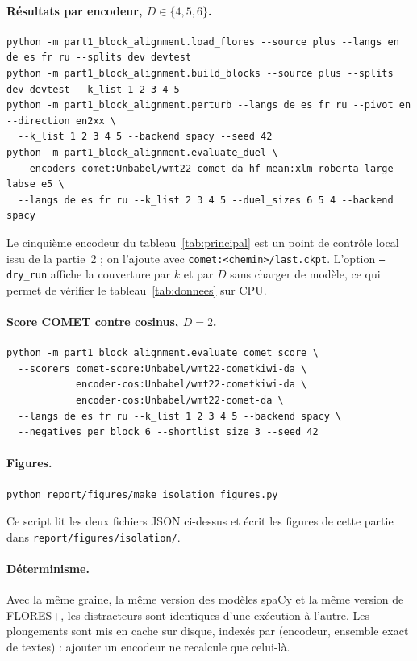 \documentclass[11pt]{article}
\newcommand{\code}[1]{\texttt{\small #1}}
\begin{document}
\paragraph{Résultats par encodeur, $D \in \{4,5,6\}$.}
\begin{verbatim}
python -m part1_block_alignment.load_flores --source plus --langs en de es fr ru --splits dev devtest
python -m part1_block_alignment.build_blocks --source plus --splits dev devtest --k_list 1 2 3 4 5
python -m part1_block_alignment.perturb --langs de es fr ru --pivot en --direction en2xx \
  --k_list 1 2 3 4 5 --backend spacy --seed 42
python -m part1_block_alignment.evaluate_duel \
  --encoders comet:Unbabel/wmt22-comet-da hf-mean:xlm-roberta-large labse e5 \
  --langs de es fr ru --k_list 2 3 4 5 --duel_sizes 6 5 4 --backend spacy
\end{verbatim}
Le cinquième encodeur du tableau~\ref{tab:principal} est un point de contrôle local issu de la partie~2 ; on l'ajoute avec \code{comet:<chemin>/last.ckpt}.
L'option \code{--dry\_run} affiche la couverture par $k$ et par $D$ sans charger de modèle, ce qui permet de vérifier le tableau~\ref{tab:donnees} sur CPU.

\paragraph{Score COMET contre cosinus, $D=2$.}
\begin{verbatim}
python -m part1_block_alignment.evaluate_comet_score \
  --scorers comet-score:Unbabel/wmt22-cometkiwi-da \
            encoder-cos:Unbabel/wmt22-cometkiwi-da \
            encoder-cos:Unbabel/wmt22-comet-da \
  --langs de es fr ru --k_list 1 2 3 4 5 --backend spacy \
  --negatives_per_block 6 --shortlist_size 3 --seed 42
\end{verbatim}

\paragraph{Figures.}
\begin{verbatim}
python report/figures/make_isolation_figures.py
\end{verbatim}
Ce script lit les deux fichiers JSON ci-dessus et écrit les figures de cette partie dans \code{report/figures/isolation/}.

\paragraph{Déterminisme.}
Avec la même graine, la même version des modèles spaCy et la même version de FLORES+, les distracteurs sont identiques d'une exécution à l'autre.
Les plongements sont mis en cache sur disque, indexés par (encodeur, ensemble exact de textes) : ajouter un encodeur ne recalcule que celui-là.
\end{document}
